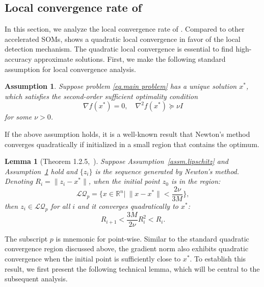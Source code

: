 \documentclass{article}
\newtheorem{lemma}[theorem]{Lemma}
\newtheorem{assumption}[theorem]{Assumption}
\numberwithin{equation}{section}
\numberwithin{equation}{section}
\begin{document}
\subsection{Local convergence rate of }
\label{sec.local}
In this section, we analyze the local convergence rate of . Compared to other accelerated SOMs,  shows a quadratic local convergence in favor of the local detection mechanism. The quadratic local convergence is essential to find high-accuracy approximate solutions. First, we make the following standard assumption for local convergence analysis.
\begin{assumption}
    \label{assm.local strongly convex}
    Suppose problem \eqref{eq.main problem} has a unique solution $x^*$, which satisfies the second-order sufficient optimality condition
    \begin{equation}
        \label{eq.second-order suff cond}
        \nabla f(x^*)=0, \quad \nabla^2 f(x^*)\succeq \nu I
    \end{equation}
    for some $\nu >0$.
\end{assumption}
If the above assumption holds, it is a well-known result that Newton's method converges quadratically if initialized in a small region that contains the optimum.
\begin{lemma}[Theorem 1.2.5,~\cite{nesterov2018lectures}]
    \label{lem.quadratic point}
    Suppose Assumption~\ref{assm.lipschitz} and Assumption~\ref{assm.local strongly convex} hold and $\{z_i\}$ is the sequence generated by Newton's method. Denoting $R_i = \|z_i-x^*\|$, when the initial point $z_0$ is in the region:
    \begin{equation}
        \label{eq.local quadratic region}
        \mathcal{LQ}_p = \{x\in\mathbb{R}^n| \ \|x-x^*\| < \frac{2\nu}{3M}\},
    \end{equation}
    then $z_i \in \mathcal{LQ}_p$ for all $i$ and it converges quadratically to $x^*$:
    \begin{equation}
        \label{eq.quadratic convergence}
        R_{i+1} < \frac{3M}{2\nu}R_i^2<R_i.
    \end{equation}
\end{lemma}
The subscript $p$ is mnemonic for point-wise. Similar to the standard quadratic convergence region discussed above, the gradient norm also exhibits quadratic convergence when the initial point is sufficiently close to $x^*$. To establish this result, we first present the following technical lemma, which will be central to the subsequent analysis.
\end{document}
